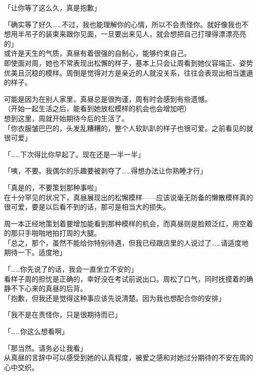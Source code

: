 「让你等了这么久，真是抱歉」

「确实等了好久……不过，我也能理解你的心情，所以不会责怪你。就好像我也不想用半吊子的装束来跟你见面，一旦要出来见人，就会想把自己打理得漂漂亮亮的」\\

或许是天生的气质，真昼有着很强的自制心，能够约束自己。\\

即使面对周，她也不常表现出松懈的样子，基本上只会让周看到她仪容端正、姿势优美且沉稳的模样。周倒是觉得对方是亲近的人就没关系，往往会表现出相当邋遢的样子。

可能是因为在别人家里，真昼总是很拘谨，周有时会感到有些遗憾。\\

（开始一起生活之后，能看到她放松模样的机会也会增加吧）\\

想到这里，周就开始期待今后的生活了。\\

「你衣服皱巴巴的，头发乱糟糟的，整个人软趴趴的样子也很可爱。之前看见的就很可爱」

「……下次得比你早起了。现在还是一半一半」

「咦，不要。我偶尔的乐趣要被剥夺了……得想办法让你熟睡才行」

「真是的，不要策划那种事啦」\\

在十分罕见的状况下，真昼展现出的松懈模样——应该说毫无防备的懒散模样真的很可爱，要是以后看不到的话，那可是相当大的损失。

周一本正经地策划着要增加能看到那种模样的机会，而真昼则是脸颊泛红，用空着的那只手啪啪地拍打周的大腿。\\

「总之，那个，虽然不能给你特别待遇，但我已经跟店里的人说过了……请适度地期待一下。适度地」

「……你先说了的话，我会一直坐立不安的」\\

看样子周的担忧是正确的，幸好没在考试前说出口。周松了口气，同时抚摸着的确静不下心来的真昼的后背。\\

「抱歉，但我还是觉得这种事应该先说清楚。因为我也想配合你的安排」

「我不是在责怪你，只是很期待而已」

「……你这么想看啊」

「那当然。请务必让我看」\\

从真昼的言辞中可以感受到她的认真程度，被爱之感和对她过分期待的不安在周的心中交织。\\

